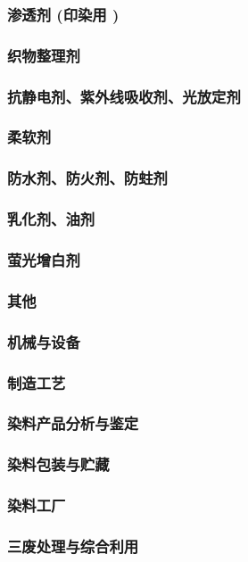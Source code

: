 \documentclass[UTF8]{../../ApplicationUniverse}
\begin{document}
        \subsubsection{渗透剂 (印染用 )}
        \subsubsection{织物整理剂}
            \subsubsection{抗静电剂、紫外线吸收剂、光放定剂}
            \subsubsection{柔软剂}
            \subsubsection{防水剂、防火剂、防蛀剂}
            \subsubsection{乳化剂、油剂}
            \subsubsection{萤光增白剂}
            \subsubsection{其他}
    \subsubsection{机械与设备}
    \subsubsection{制造工艺}
    \subsubsection{染料产品分析与鉴定}
        \subsubsection{染料包装与贮藏}
    \subsubsection{染料工厂}
    \subsubsection{三废处理与综合利用}
\end{document}

